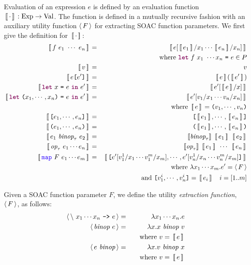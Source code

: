 \documentclass[oneside,11pt]{book}
\begin{document}
Evaluation of an expression $e$ is defined by an evaluation function
$\,[\![\,\cdot\,]\!]\, : \mathrm{Exp} \rightarrow \mathrm{Val}$. The function
is defined in a mutually recursive fashion with an auxiliary utility
function $\langle\,F\,\rangle$ for extracting SOAC function parameters. We
first give the definition for $\,[\![\,\cdot\,]\!]\,$:
\begin{eqnarray*}
  \Eval{f~e_1~\cdots~e_n} & = & \Eval{e[\Eval{e_1}/x_1\cdots \Eval{e_n}/x_n]} \\ & & ~~~ \mathrm{where}~\fw{let}~f~x_1~ \cdots x_n ~\kw{=}~ e \in P \\
  \Eval{v} & = & v \\
  \Eval{e\kw{[}e'\kw{]}} & = & \Eval{e}(\Eval{e'}) \\
  \Eval{\fw{let}~x~\kw{=}~e~\fw{in}~e'} & = & \Eval{e'[\Eval{e}/x]} \\
  \Eval{\fw{let}~\kw{(}x_1,\cdots,x_n\kw{)}~\kw{=}~e~\fw{in}~e'} & = & \Eval{e'[v_1/x_1\cdots v_n/x_n]} \\ & & ~~~ \mathrm{where}~ \Eval{e} = \kw{(}v_1,\cdots,v_n\kw{)} \\
  \Eval{\kw{[}e_1,\cdots,e_n\kw{]}} & = & \kw{[}\Eval{e_1},\cdots,\Eval{e_n}\kw{]} \\
  \Eval{\kw{(}e_1,\cdots,e_n\kw{)}} & = & \kw{(}\Eval{e_1},\cdots,\Eval{e_n}\kw{)} \\
  \Eval{e_1~\id{binop}_\tau~e_2} & = & \sem{\id{binop}_\tau}~\Eval{e_1}~\Eval{e_2} \\
  \Eval{\id{op}_\tau~e_1\cdots e_n} & = & \sem{\id{op}_\tau}~\Eval{e_1}~\cdots~\Eval{e_n} \\
  \Eval{\fop{map}~F~e_1\cdots e_m} & = & \Eval{\kw{[}e'[v_1^1/x_1\cdots v_1^m/x_m],\cdots,e'[v_n^1/x_n\cdots v_n^m/x_m]\kw{]}} \\
    & & ~~~\mathrm{where}~\lambda x_1\cdots x_m . e' = \extractF{F} \\
    & & ~~~~~\mathrm{and}~ \kw{[}v_1^i,\cdots,v_n^i\kw{]} = \Eval{e_i} ~~~ i=[1..m]
\end{eqnarray*}

Given a SOAC function parameter $F$, we define the utility \emph{extraction function}, $\langle\,F\,\rangle$, as follows:
\begin{eqnarray*}
  \langle\,\backslash~x_1\cdots x_n~\texttt{->}~ e\,\rangle & = & \lambda x_1 \cdots x_n . e \\
  \langle\,\mbox{\it{binop}}~e\,\rangle & = & \lambda x . x~\mbox{\it{binop}}~v \\
    & & ~~~\mathrm{where}~v = \,[\![\,e\,]\!]\, \\
  \langle\,e~\mbox{\it{binop}}\,\rangle & = & \lambda x . v~\mbox{\it{binop}}~x \\
    & & ~~~\mathrm{where}~v = \,[\![\,e\,]\!]\,
\end{eqnarray*}
\end{document}
